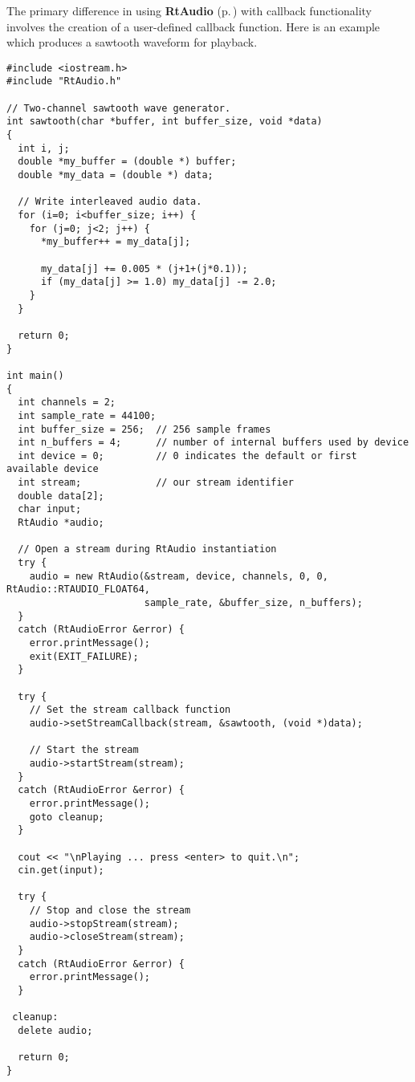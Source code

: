 The primary difference in using {\bf Rt\-Audio} {\rm (p.\,\pageref{classRtAudio})} with callback functionality involves the creation of a user-defined callback function. Here is an example which produces a sawtooth waveform for playback.

\footnotesize\begin{verbatim}#include <iostream.h>
#include "RtAudio.h"

// Two-channel sawtooth wave generator.
int sawtooth(char *buffer, int buffer_size, void *data)
{
  int i, j;
  double *my_buffer = (double *) buffer;
  double *my_data = (double *) data;

  // Write interleaved audio data.
  for (i=0; i<buffer_size; i++) {
    for (j=0; j<2; j++) {
      *my_buffer++ = my_data[j];

      my_data[j] += 0.005 * (j+1+(j*0.1));
      if (my_data[j] >= 1.0) my_data[j] -= 2.0;
    }
  }

  return 0;
}

int main()
{
  int channels = 2;
  int sample_rate = 44100;
  int buffer_size = 256;  // 256 sample frames
  int n_buffers = 4;      // number of internal buffers used by device
  int device = 0;         // 0 indicates the default or first available device
  int stream;             // our stream identifier
  double data[2];
  char input;
  RtAudio *audio;

  // Open a stream during RtAudio instantiation
  try {
    audio = new RtAudio(&stream, device, channels, 0, 0, RtAudio::RTAUDIO_FLOAT64,
                        sample_rate, &buffer_size, n_buffers);
  }
  catch (RtAudioError &error) {
    error.printMessage();
    exit(EXIT_FAILURE);
  }

  try {
    // Set the stream callback function
    audio->setStreamCallback(stream, &sawtooth, (void *)data);

    // Start the stream
    audio->startStream(stream);
  }
  catch (RtAudioError &error) {
    error.printMessage();
    goto cleanup;
  }

  cout << "\nPlaying ... press <enter> to quit.\n";
  cin.get(input);

  try {
    // Stop and close the stream
    audio->stopStream(stream);
    audio->closeStream(stream);
  }
  catch (RtAudioError &error) {
    error.printMessage();
  }

 cleanup:
  delete audio;

  return 0;
}\end{verbatim}\normalsize 


